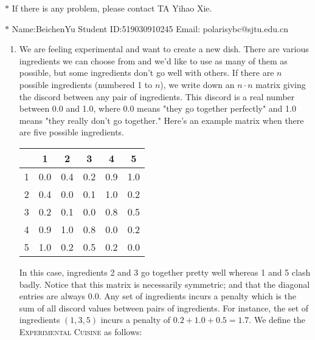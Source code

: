 \documentclass[12pt,a4paper]{article}
\theoremstyle{definition}
\begin{document}
\noindent

\noindent{}
\begin{center}
\footnotesize{\color{red}$*$ If there is any problem, please contact TA Yihao Xie. }

\footnotesize{\color{blue}$*$ Name:BeichenYu  \quad Student ID:519030910245 \quad Email: polarisybc@sjtu.edu.cn}
\end{center}

\begin{enumerate}
    \item We are feeling experimental and want to create a new dish. There are various ingredients we can choose from and we'd like to use as many of them as possible, but some ingredients don't go well with others. If there are $n$ possible ingredients (numbered 1 to $n$), we write down an $n\cdot n$ matrix giving the discord between any pair of ingredients. This discord is a real number between 0.0 and 1.0, where 0.0 means "they go together perfectly" and 1.0 means "they really don't go together." Here's an example matrix when there are five possible ingredients.
    \begin{center}
        \begin{tabular}{|c|ccccc|}
        \hline
             & 1  & 2 & 3 & 4 & 5\\
        \hline
            1 & 0.0 & 0.4 & 0.2 & 0.9 & 1.0\\
            2 & 0.4 & 0.0 & 0.1 & 1.0 & 0.2\\
            3 & 0.2 & 0.1 & 0.0 & 0.8 & 0.5\\
            4 & 0.9 & 1.0 & 0.8 & 0.0 & 0.2\\
            5 & 1.0 & 0.2 & 0.5 & 0.2 & 0.0\\
        \hline
        \end{tabular}
    \end{center}
    In this case, ingredients 2 and 3 go together pretty well whereas 1 and 5 clash badly. Notice that this matrix is necessarily symmetric; and that the diagonal entries are always 0.0. Any set of ingredients incurs a penalty which is the sum of all discord values between pairs of ingredients. For instance, the set of ingredients $(1,3,5)$ incurs a penalty of $0.2+1.0+0.5 = 1.7$. We define the \textsc{Experimental Cuisine} as follows:


\end{enumerate}
\end{document}
